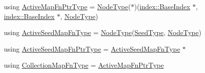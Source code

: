 \begin{DoxyCompactItemize}
\item 
using \hyperlink{namespacevt_1_1mapping_a748d5efb71ca5878288d5809f57d7254}{Active\+Map\+Fn\+Ptr\+Type} = \hyperlink{namespacevt_a866da9d0efc19c0a1ce79e9e492f47e2}{Node\+Type}($\ast$)(\hyperlink{structvt_1_1index_1_1_base_index}{index\+::\+Base\+Index} $\ast$, \hyperlink{structvt_1_1index_1_1_base_index}{index\+::\+Base\+Index} $\ast$, \hyperlink{namespacevt_a866da9d0efc19c0a1ce79e9e492f47e2}{Node\+Type})
\item 
using \hyperlink{namespacevt_1_1mapping_ab9cfcd87eb3ff00e63478d0197056b7e}{Active\+Seed\+Map\+Fn\+Type} = \hyperlink{namespacevt_a866da9d0efc19c0a1ce79e9e492f47e2}{Node\+Type}(\hyperlink{namespacevt_ae2e13198bdef4d5b8e603d6c1c7f0969}{Seed\+Type}, \hyperlink{namespacevt_a866da9d0efc19c0a1ce79e9e492f47e2}{Node\+Type})
\item 
using \hyperlink{namespacevt_1_1mapping_a254b50d55be91c3bd002481b2e96da7e}{Active\+Seed\+Map\+Fn\+Ptr\+Type} = \hyperlink{namespacevt_1_1mapping_ab9cfcd87eb3ff00e63478d0197056b7e}{Active\+Seed\+Map\+Fn\+Type} $\ast$
\item 
using \hyperlink{namespacevt_1_1mapping_a2910ab582d95478603cdca7480af65b2}{Collection\+Map\+Fn\+Type} = \hyperlink{namespacevt_1_1mapping_a748d5efb71ca5878288d5809f57d7254}{Active\+Map\+Fn\+Ptr\+Type}
\end{DoxyCompactItemize}
